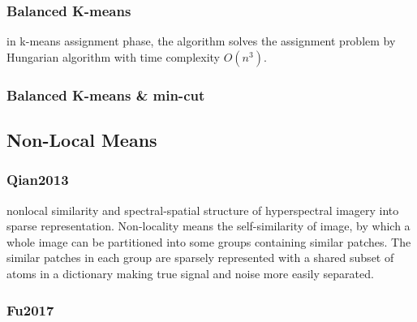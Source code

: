 \subsubsection{Balanced K-means}
\cite{Malinen2014} 
in k-means assignment phase, the algorithm solves the assignment problem by Hungarian algorithm with time complexity $O(n^3)$.

\subsubsection{Balanced K-means \& min-cut}
\cite{Chang2014}

\subsection{Non-Local Means}
\subsubsection{Qian2013}
\cite{Qian2013} 
nonlocal similarity and spectral-spatial structure of hyperspectral imagery into sparse representation. Non-locality means the self-similarity of image, by which a whole image can be partitioned into some groups containing similar patches. The similar patches in each group are sparsely represented with a shared subset of atoms in a dictionary making true signal and noise more easily separated.

\subsubsection{Fu2017}
\cite{Fu2017}